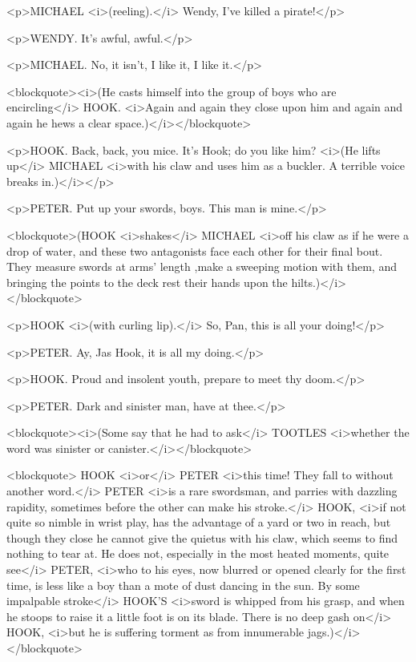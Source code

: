 <p>MICHAEL <i>(reeling).</i> Wendy, I've killed a pirate!</p>

<p>WENDY. It's awful, awful.</p>

<p>MICHAEL. No, it isn't, I like it, I like it.</p>

<blockquote><i>(He casts himself into the group of boys who are
encircling</i> HOOK. <i>Again and again they close upon him and again
and again he hews a clear space.)</i></blockquote>

<p>HOOK. Back, back, you mice. It's Hook; do you like him? <i>(He
lifts up</i> MICHAEL <i>with his claw and uses him as a buckler. A
terrible voice breaks in.)</i></p>

<p>PETER. Put up your swords, boys. This man is mine.</p>

<blockquote>(HOOK <i>shakes</i> MICHAEL <i>off his claw as if he were
a drop of water, and these two antagonists face each other for their
final bout. They measure swords at arms' length ,make a sweeping
motion with them, and bringing the points to the deck rest their
hands upon the hilts.)</i></blockquote>

<p>HOOK <i>(with curling lip).</i> So, Pan, this is all your
doing!</p>

<p>PETER. Ay, Jas Hook, it is all my doing.</p>

<p>HOOK. Proud and insolent youth, prepare to meet thy doom.</p>

<p>PETER. Dark and sinister man, have at thee.</p>

<blockquote><i>(Some say that he had to ask</i> TOOTLES <i>whether
the word was sinister or canister.</i></blockquote>

<blockquote>   HOOK <i>or</i> PETER <i>this time! They fall to
without another word.</i> PETER <i>is a rare swordsman, and parries
with dazzling rapidity, sometimes before the other can make his
stroke.</i> HOOK, <i>if not quite so nimble in wrist play, has the
advantage of a yard or two in reach, but though they close he cannot
give the quietus with his claw, which seems to find nothing to tear
at. He does not, especially in the most heated moments, quite see</i>
PETER, <i>who to his eyes, now blurred or opened clearly for the
first time, is less like a boy than a mote of dust dancing in the
sun. By some impalpable stroke</i> HOOK'S <i>sword is whipped from
his grasp, and when he stoops to raise it a little foot is on its
blade. There is no deep gash on</i> HOOK, <i>but he is suffering
torment as from innumerable jags.)</i></blockquote>

